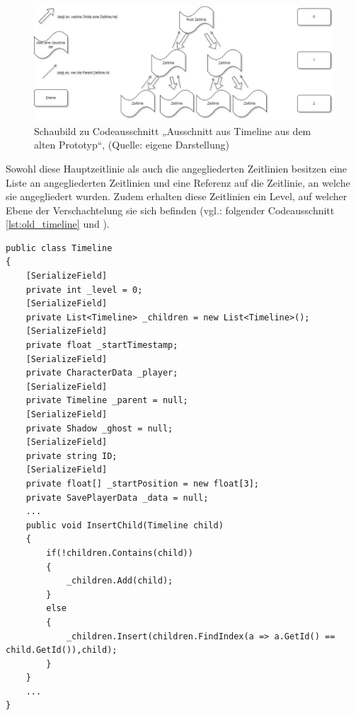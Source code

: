 \begin{figure}[ht]
\centering
\includegraphics[width=1\linewidth]{content/pictures/Schaubild Timeline.jpg}
\caption{Schaubild zu Codeausschnitt „Ausschnitt aus Timeline aus dem alten Prototyp“, (Quelle: eigene Darstellung)}
\label{fig:codesnippet_timeline}
\end{figure}

Sowohl diese Hauptzeitlinie als auch die angegliederten Zeitlinien besitzen eine Liste an angegliederten Zeitlinien und eine Referenz auf die Zeitlinie, an welche sie angegliedert wurden. Zudem erhalten diese Zeitlinien ein Level, auf welcher Ebene der Verschachtelung sie sich befinden (vgl.: folgender Codeausschnitt \ref{lst:old_timeline} und ).

\newpage
\begin{lstlisting}[caption={Ausschnitt aus Timeline.cs aus dem alten Prototyp}, label={lst:old_timeline}]
public class Timeline
{
    [SerializeField]
    private int _level = 0;
    [SerializeField]
    private List<Timeline> _children = new List<Timeline>();
    [SerializeField]
    private float _startTimestamp;
    [SerializeField]
    private CharacterData _player;
    [SerializeField]
    private Timeline _parent = null;
    [SerializeField]
    private Shadow _ghost = null;
    [SerializeField]
    private string ID;
    [SerializeField]
    private float[] _startPosition = new float[3];
    private SavePlayerData _data = null;
    ...
    public void InsertChild(Timeline child)
    {
        if(!children.Contains(child))
        {
            _children.Add(child);
        }
        else
        {
            _children.Insert(children.FindIndex(a => a.GetId() == child.GetId()),child);
        }
    }
    ...
}
\end{lstlisting}

